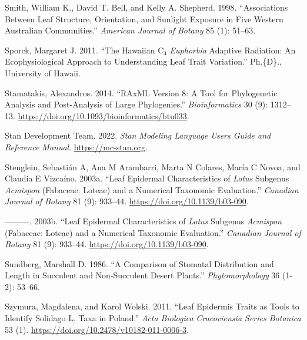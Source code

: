 \documentclass[
  12pt,
]{article}
\newlength{\cslhangindent}
\newlength{\cslentryspacingunit} %
\newenvironment{CSLReferences}[2] %
 {%
  \setlength{\parindent}{0pt}
  \ifodd #1
  \let\oldpar\par
  \def\par{\hangindent=\cslhangindent\oldpar}
  \fi
  \setlength{\parskip}{#2\cslentryspacingunit}
 }%
 {}
\begin{document}
\begin{CSLReferences}{1}{0}
\leavevmode{}%
Smith, William K., David T. Bell, and Kelly A. Shepherd. 1998. {``Associations Between Leaf Structure, Orientation, and Sunlight Exposure in Five {Western} {Australian} Communities.''} \emph{American Journal of Botany} 85 (1): 51--63.

\leavevmode{}%
Sporck, Margaret J. 2011. {``The {Hawaiian} {C}\(_{\textrm{4}}\) \emph{Euphorbia} Adaptive Radiation: An Ecophysiological Approach to Understanding Leaf Trait Variation.''} Ph.\{D\}., University of Hawaii.

\leavevmode{}%
Stamatakis, Alexandros. 2014. {``{RAxML} Version 8: A Tool for Phylogenetic Analysis and Post-Analysis of Large Phylogenies.''} \emph{Bioinformatics} 30 (9): 1312--13. \url{https://doi.org/10.1093/bioinformatics/btu033}.

\leavevmode{}%
Stan Development Team. 2022. \emph{Stan {Modeling} {Language} {Users} {Guide} and {Reference} {Manual}}. \url{https://mc-stan.org}.

\leavevmode{}%
Stenglein, Sebastián A, Ana M Arambarri, Marta N Colares, María C Novoa, and Claudia E Vizcaíno. 2003a. {``Leaf Epidermal Characteristics of \emph{Lotus} Subgenus \emph{Acmispon} ({Fabaceae}: {Loteae}) and a Numerical Taxonomic Evaluation.''} \emph{Canadian Journal of Botany} 81 (9): 933--44. \url{https://doi.org/10.1139/b03-090}.

\leavevmode{}%
---------. 2003b. {``Leaf Epidermal Characteristics of \emph{Lotus} Subgenus \emph{Acmispon} ({Fabaceae}: {Loteae}) and a Numerical Taxonomic Evaluation.''} \emph{Canadian Journal of Botany} 81 (9): 933--44. \url{https://doi.org/10.1139/b03-090}.

\leavevmode{}%
Sundberg, Marshall D. 1986. {``A Comparison of Stomatal Distribution and Length in Succulent and Non-Succulent Desert Plants.''} \emph{Phytomorphology} 36 (1-2): 53--66.

\leavevmode{}%
Szymura, Magdalena, and Karol Wolski. 2011. {``Leaf {Epidermis} {Traits} as {Tools} to {Identify} {Solidago} {L}. {Taxa} in {Poland}.''} \emph{Acta Biologica Cracoviensia Series Botanica} 53 (1). \url{https://doi.org/10.2478/v10182-011-0006-3}.


\end{CSLReferences}
\end{document}
